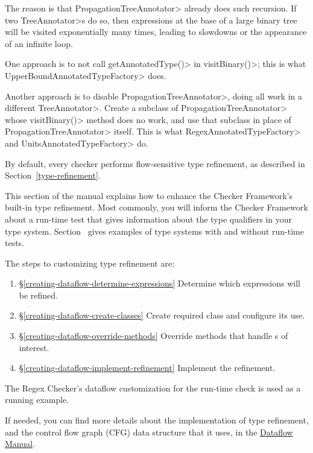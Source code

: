 \noindent
The reason is that \<PropagationTreeAnnotator> already does such recursion.  If
two \<TreeAnnotator>s do so, then expressions at the base of a large binary tree
will be visited exponentially many times, leading to slowdowns or the appearance
of an infinite loop.

One approach is to not call \<getAnnotatedType()> in \<visitBinary()>; this is
what \<UpperBoundAnnotatedTypeFactory> does.

Another approach is to disable \<PropagationTreeAnnotator>, doing all work in a
different \<TreeAnnotator>.  Create a subclass of \<PropagationTreeAnnotator>
whose \<visitBinary()> method does no work, and use that subclass in place of
\<PropagationTreeAnnotator> itself.  This is what \<RegexAnnotatedTypeFactory>
and \<UnitsAnnotatedTypeFactory> do.



By default, every checker performs flow-sensitive type refinement, as described
in Section~\ref{type-refinement}.

This section of the manual explains how to enhance the Checker Framework's
built-in type refinement.
Most commonly, you will inform the Checker Framework about a run-time test
that gives information about the type qualifiers in your type system.
Section~ gives examples of
type systems with and without run-time tests.

The steps to customizing type refinement are:
\begin{enumerate}
\item{\S\ref{creating-dataflow-determine-expressions}}
  Determine which expressions will be refined.
\item{\S\ref{creating-dataflow-create-classes}}
  Create required class and configure its use.
\item{\S\ref{creating-dataflow-override-methods}}
  Override methods that handle s of interest.
\item{\S\ref{creating-dataflow-implement-refinement}}
  Implement the refinement.
\end{enumerate}

The Regex Checker's dataflow customization for the
run-time check is used as a running example.

If needed, you can find more details about the implementation of
type refinement, and the control flow graph (CFG) data
structure that it uses, in the
\href{https://eisop.github.io/cf/manual/checker-framework-dataflow-manual.pdf}{Dataflow
  Manual}.


